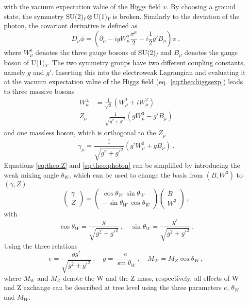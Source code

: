 with the vacuum expectation value of the Higgs field $v$. By choosing a ground state, the symmetry SU(2)$_I\otimes$U(1)$_Y$ is broken. Similarly to the deviation of the photon, the covariant derivative is defined as
\begin{equation}
D_\mu \phi = \left( \partial_\mu -igW_\mu^a\frac{\sigma^a}{2} - i\frac{1}{2}g'B_\mu \right)\phi ~,
\end{equation}
where $W_\mu^a$ denotes the three gauge bosons of SU(2)$_I$ and $B_\mu$ denotes the gauge boson of U(1)$_Y$. The two symmetry groups have two different coupling constants, namely $g$ and $g'$. Inserting this into the electroweak Lagrangian and evaluating it at the vacuum expectation value of the Higgs field (eq.~\ref{eq:theo:higgsexp}) leads to three massive bosons
\begin{align}
W_\mu^\pm &= \frac{1}{\sqrt{2}}\left( W_\mu^1 \mp iW_\mu^2 \right) \\
Z_\mu &= \frac{1}{\sqrt{g^2+g'^2}}\left( gW_\mu^3-g'B_\mu\right) \label{eq:theo:Z}
\end{align}
and one massless boson, which is orthogonal to the $Z_\mu$
\begin{equation}
\gamma_\mu = \frac{1}{\sqrt{g^2+g'^2}}\left( g'W_\mu^3 + gB_\mu \right) ~. \label{eq:theo:photon}
\end{equation}
Equations \ref{eq:theo:Z} and \ref{eq:theo:photon} can be simplified by introducing the weak mixing angle $\theta_W$, which can be used to change the basis from $(B,W^3)$ to $(\gamma,Z)$
\begin{equation}
\left( \begin{array}{c} \gamma \\ Z \end{array} \right) = \left( \begin{array}{c} \cos \theta_W ~  \sin \theta_W \\ -\sin \theta_W ~  \cos \theta_W \end{array} \right) \left( \begin{array}{c} B \\ W^3 \end{array} \right) ~,
\end{equation}
with 
\begin{equation}
\cos \theta_W = \frac{g}{\sqrt{g^2+g'^2}} ~, \quad \sin \theta_W = \frac{g'}{\sqrt{g^2+g'^2}} ~.
\end{equation}
Using the three relations
\begin{equation}
e=\frac{gg'}{\sqrt{g^2+g'^2}} ~, \quad g=\frac{e}{\sin \theta_W} ~, \quad M_W=M_Z \cos \theta_W ~,
\end{equation}
where $M_W$ and $M_Z$ denote the W and the Z mass, respectively, all effects of W and Z exchange can be described at tree level using the three parameters $e$, $\theta_W$ and $M_W$.\\


